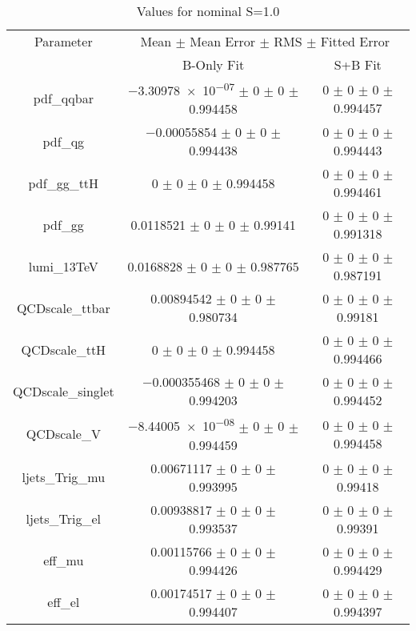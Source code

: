 \begin{table}
\centering
\caption{Values for nominal S=1.0}
\begin{tabular}{ccc}
\toprule
Parameter & \multicolumn{2}{c}{Mean $\pm$ Mean Error $\pm$ RMS $\pm$ Fitted Error}\\
 & B-Only Fit & S+B Fit\\
\midrule
pdf\_qqbar & \num{-3.30978e-07} $\pm$ \num{0} $\pm$ \num{0} $\pm$ \num{0.994458} & \num{0} $\pm$ \num{0} $\pm$ \num{0} $\pm$ \num{0.994457}\\
pdf\_qg & \num{-0.00055854} $\pm$ \num{0} $\pm$ \num{0} $\pm$ \num{0.994438} & \num{0} $\pm$ \num{0} $\pm$ \num{0} $\pm$ \num{0.994443}\\
pdf\_gg\_ttH & \num{0} $\pm$ \num{0} $\pm$ \num{0} $\pm$ \num{0.994458} & \num{0} $\pm$ \num{0} $\pm$ \num{0} $\pm$ \num{0.994461}\\
pdf\_gg & \num{0.0118521} $\pm$ \num{0} $\pm$ \num{0} $\pm$ \num{0.99141} & \num{0} $\pm$ \num{0} $\pm$ \num{0} $\pm$ \num{0.991318}\\
lumi\_13TeV & \num{0.0168828} $\pm$ \num{0} $\pm$ \num{0} $\pm$ \num{0.987765} & \num{0} $\pm$ \num{0} $\pm$ \num{0} $\pm$ \num{0.987191}\\
QCDscale\_ttbar & \num{0.00894542} $\pm$ \num{0} $\pm$ \num{0} $\pm$ \num{0.980734} & \num{0} $\pm$ \num{0} $\pm$ \num{0} $\pm$ \num{0.99181}\\
QCDscale\_ttH & \num{0} $\pm$ \num{0} $\pm$ \num{0} $\pm$ \num{0.994458} & \num{0} $\pm$ \num{0} $\pm$ \num{0} $\pm$ \num{0.994466}\\
QCDscale\_singlet & \num{-0.000355468} $\pm$ \num{0} $\pm$ \num{0} $\pm$ \num{0.994203} & \num{0} $\pm$ \num{0} $\pm$ \num{0} $\pm$ \num{0.994452}\\
QCDscale\_V & \num{-8.44005e-08} $\pm$ \num{0} $\pm$ \num{0} $\pm$ \num{0.994459} & \num{0} $\pm$ \num{0} $\pm$ \num{0} $\pm$ \num{0.994458}\\
ljets\_Trig\_mu & \num{0.00671117} $\pm$ \num{0} $\pm$ \num{0} $\pm$ \num{0.993995} & \num{0} $\pm$ \num{0} $\pm$ \num{0} $\pm$ \num{0.99418}\\
ljets\_Trig\_el & \num{0.00938817} $\pm$ \num{0} $\pm$ \num{0} $\pm$ \num{0.993537} & \num{0} $\pm$ \num{0} $\pm$ \num{0} $\pm$ \num{0.99391}\\
eff\_mu & \num{0.00115766} $\pm$ \num{0} $\pm$ \num{0} $\pm$ \num{0.994426} & \num{0} $\pm$ \num{0} $\pm$ \num{0} $\pm$ \num{0.994429}\\
eff\_el & \num{0.00174517} $\pm$ \num{0} $\pm$ \num{0} $\pm$ \num{0.994407} & \num{0} $\pm$ \num{0} $\pm$ \num{0} $\pm$ \num{0.994397}\\

\end{tabular}
\end{table}

